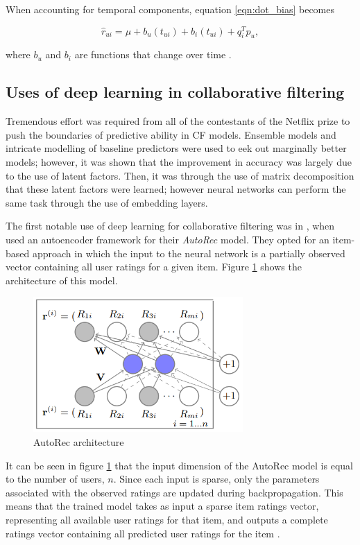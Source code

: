 When accounting for temporal components, equation \ref{eqn:dot_bias} becomes

\begin{equation}
    \hat{r}_{ui} = \mu + b_u(t_{ui}) + b_i(t_{ui}) + q_i^T p_u,
\label{eqn:temp_baseline}
\end{equation}

where $b_u$ and $b_i$ are functions that change over time \parencite{netflix_bellkor}.

\subsection{Uses of deep learning in collaborative filtering}
Tremendous effort was required from all of the contestants of the Netflix prize to push the boundaries of predictive ability in CF models. Ensemble models and intricate modelling of baseline predictors were used to eek out marginally better models; however, it was shown that the improvement in accuracy was largely due to the use of latent factors. Then, it was through the use of matrix decomposition that these latent factors were learned; however neural networks can perform the same task through the use of embedding layers.

The first notable use of deep learning for collaborative filtering was in \cite*{sedhain2015autorec}, when \citeauthor{sedhain2015autorec} used an autoencoder framework for their \textit{AutoRec} model. They opted for an item-based approach in which the input to the neural network is a partially observed vector containing all user ratings for a given item. Figure \ref{fig:autorec-arch} shows the architecture of this model.

\begin{figure}[H]
\centering
\includegraphics[width=8cm]{Figures/2_autoRec.png}
\decoRule
\caption[AutoRec]{AutoRec architecture \parencite{sedhain2015autorec}}
\label{fig:autorec-arch}
\end{figure}

It can be seen in figure \ref{fig:autorec-arch} that the input dimension of the AutoRec model is equal to the number of users, $n$. Since each input is sparse, only the parameters associated with the observed ratings are updated during backpropagation. This means that the trained model takes as input a sparse item ratings vector, representing all available user ratings for that item, and outputs a complete ratings vector containing all predicted user ratings for the item \parencite{sedhain2015autorec}.

